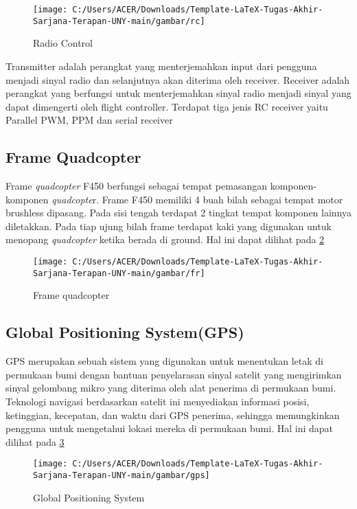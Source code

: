 \begin{figure}[H]
	\centering
	\texttt{[image: C:/Users/ACER/Downloads/Template-LaTeX-Tugas-Akhir-Sarjana-Terapan-UNY-main/gambar/rc]}
	\caption{Radio Control}
	\label{fig:rc}
\end{figure}

Transmitter adalah perangkat yang menterjemahkan input dari pengguna menjadi sinyal radio dan selanjutnya akan diterima oleh receiver. Receiver adalah perangkat yang berfungsi untuk menterjemahkan sinyal radio menjadi sinyal yang dapat dimengerti oleh flight controller. Terdapat tiga jenis RC receiver yaitu Parallel PWM, PPM dan serial receiver

\subsection{Frame Quadcopter}
Frame \textit{quadcopter} F450 berfungsi sebagai tempat pemasangan komponen-komponen \textit{quadcopte}r\cite{airlangga2023perencanaan}. Frame F450 memiliki 4 buah bilah sebagai tempat motor brushless dipasang. Pada sisi tengah terdapat 2 tingkat tempat komponen lainnya diletakkan. Pada tiap ujung bilah frame terdapat kaki yang digunakan untuk menopang \textit{quadcopter} ketika berada di ground. Hal ini dapat dilihat pada \cref{fig:fr}

\begin{figure}[H]
	\centering
	\texttt{[image: C:/Users/ACER/Downloads/Template-LaTeX-Tugas-Akhir-Sarjana-Terapan-UNY-main/gambar/fr]}
	\caption{Frame quadcopter}
	\label{fig:fr}
\end{figure}


\subsection{Global Positioning System(GPS)}
GPS merupakan sebuah sistem yang digunakan untuk menentukan letak di permukaan bumi dengan bantuan penyelarasan sinyal satelit yang mengirimkan sinyal gelombang mikro yang diterima oleh alat penerima di permukaan bumi\cite{syaddad2020perancangan}. Teknologi navigasi berdasarkan satelit ini menyediakan informasi posisi, ketinggian, kecepatan, dan waktu dari GPS penerima, sehingga memungkinkan pengguna untuk mengetahui lokasi mereka di permukaan bumi. Hal ini dapat dilihat pada \cref{fig:gps}

\begin{figure}[H]
	\centering
	\texttt{[image: C:/Users/ACER/Downloads/Template-LaTeX-Tugas-Akhir-Sarjana-Terapan-UNY-main/gambar/gps]}
	\caption{Global Positioning System}
	\label{fig:gps}
\end{figure}

